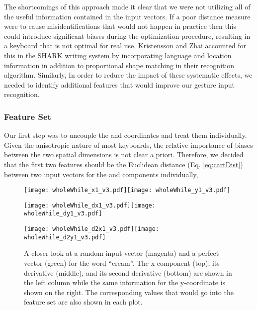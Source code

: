 \documentclass[final,1p,times,authoryear]{elsarticle}
\begin{document}
The shortcomings of this approach made it clear that we were not utilizing all of the useful information contained in the input vectors.
If a poor distance measure were to cause misidentifications that would not happen in practice then this could introduce significant biases during the optimization procedure, resulting in a keyboard that is not optimal for real use.
Kristensson and Zhai accounted for this in the SHARK writing system by incorporating language and location information in addition to proportional shape matching in their recognition algorithm.
Similarly, In order to reduce the impact of these systematic effects, we needed to identify additional features that would improve our gesture input recognition.

\subsubsection{Feature Set}
Our first step was to uncouple the  and  coordinates and treat
them individually. Given the anisotropic nature of most keyboards, the
relative importance of biases between the two spatial dimensions is
not clear a priori. Therefore, we decided that the first two features
should be the Euclidean distance (Eq. \ref{eq:cartDist})
between two input vectors for the  and  components individually,


\begin{figure}[t]
\begin{centering}
\texttt{[image: wholeWhile\_x1\_v3.pdf]}\texttt{[image: wholeWhile\_y1\_v3.pdf]}
\par\end{centering}
\begin{centering}
\texttt{[image: wholeWhile\_dx1\_v3.pdf]}\texttt{[image: wholeWhile\_dy1\_v3.pdf]}
\par\end{centering}
\begin{centering}
\texttt{[image: wholeWhile\_d2x1\_v3.pdf]}\texttt{[image: wholeWhile\_d2y1\_v3.pdf]}
\par\end{centering}
\medskip{}
\protect\caption{A closer look at a random input vector (magenta) and a perfect vector
(green) for the word ``cream''. The x-component (top), its derivative
(middle), and its second derivative (bottom) are shown in the left
column while the same information for the y-coordinate is shown on
the right. The corresponding values that would go into the feature
set  are also shown in each plot.\label{fig:A-closer-look}}
\end{figure}
\end{document}
